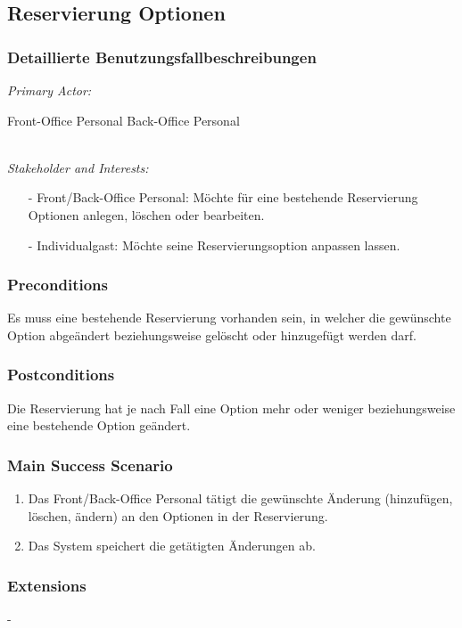 \documentclass[./detailed_overview_usecases.tex]{subfiles}
\begin{document}
    \subsection{Reservierung Optionen}
    \subsubsection{Detaillierte Benutzungsfallbeschreibungen}
    \textit{Primary Actor:}
    \begin{enumerate}
        Front-Office Personal
        Back-Office Personal
    \end{enumerate}
    \\
    \textit{Stakeholder and Interests:}
    \begin{itemize}
        \item[-] Front/Back-Office Personal: Möchte für eine bestehende Reservierung Optionen anlegen, löschen oder bearbeiten.
        \item[-] Individualgast: Möchte seine Reservierungsoption anpassen lassen.
    \end{itemize}

    \subsubsection*{Preconditions}
    Es muss eine bestehende Reservierung vorhanden sein, in welcher die gewünschte Option abgeändert beziehungsweise gelöscht oder hinzugefügt werden darf.

    \subsubsection*{Postconditions}
    Die Reservierung hat je nach Fall eine Option mehr oder weniger beziehungsweise eine bestehende Option geändert.

    \subsubsection*{Main Success Scenario}
    \begin{enumerate}
        \item Das Front/Back-Office Personal tätigt die gewünschte Änderung (hinzufügen, löschen, ändern) an den Optionen in der Reservierung.
        \item Das System speichert die getätigten Änderungen ab.
    \end{enumerate}

    \subsubsection*{Extensions}
    -
\end{document}
